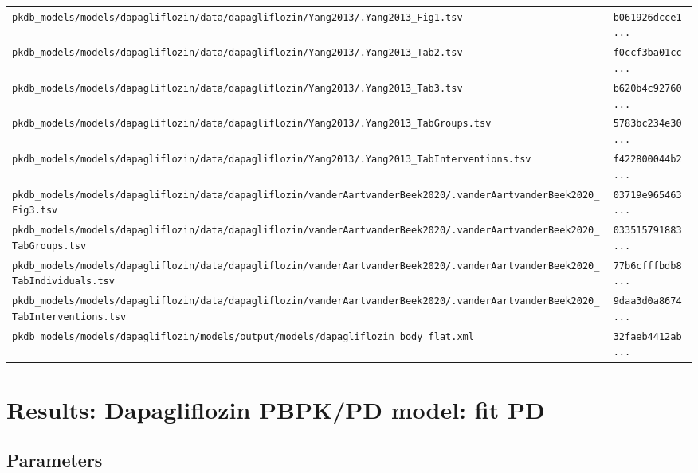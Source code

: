 \documentclass{article}
\begin{document}
\begin{longtable}{ll}
\texttt{pkdb\_models/models/dapagliflozin/data/dapagliflozin/Yang2013/.Yang2013\_Fig1.tsv} & \texttt{b061926dcce1...} \\
\texttt{pkdb\_models/models/dapagliflozin/data/dapagliflozin/Yang2013/.Yang2013\_Tab2.tsv} & \texttt{f0ccf3ba01cc...} \\
\texttt{pkdb\_models/models/dapagliflozin/data/dapagliflozin/Yang2013/.Yang2013\_Tab3.tsv} & \texttt{b620b4c92760...} \\
\texttt{pkdb\_models/models/dapagliflozin/data/dapagliflozin/Yang2013/.Yang2013\_TabGroups.tsv} & \texttt{5783bc234e30...} \\
\texttt{pkdb\_models/models/dapagliflozin/data/dapagliflozin/Yang2013/.Yang2013\_TabInterventions.tsv} & \texttt{f422800044b2...} \\
\texttt{pkdb\_models/models/dapagliflozin/data/dapagliflozin/vanderAartvanderBeek2020/.vanderAartvanderBeek2020\_Fig3.tsv} & \texttt{03719e965463...} \\
\texttt{pkdb\_models/models/dapagliflozin/data/dapagliflozin/vanderAartvanderBeek2020/.vanderAartvanderBeek2020\_TabGroups.tsv} & \texttt{033515791883...} \\
\texttt{pkdb\_models/models/dapagliflozin/data/dapagliflozin/vanderAartvanderBeek2020/.vanderAartvanderBeek2020\_TabIndividuals.tsv} & \texttt{77b6cfffbdb8...} \\
\texttt{pkdb\_models/models/dapagliflozin/data/dapagliflozin/vanderAartvanderBeek2020/.vanderAartvanderBeek2020\_TabInterventions.tsv} & \texttt{9daa3d0a8674...} \\
\texttt{pkdb\_models/models/dapagliflozin/models/output/models/dapagliflozin\_body\_flat.xml} & \texttt{32faeb4412ab...} \\
\end{longtable}

\section{Results: Dapagliflozin PBPK/PD model: fit PD}

\subsection{Parameters}
\end{document}
